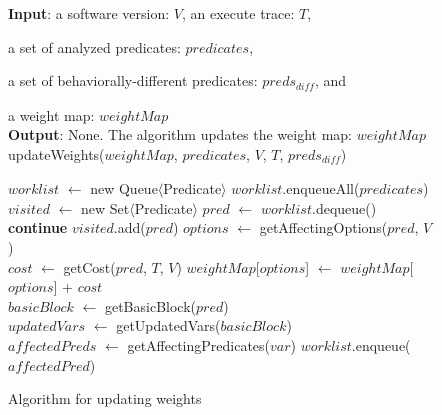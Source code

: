 
\begin{figure}[t]
\textbf{Input}: a software version: $\mathit{V}$, an execute trace: $\mathit{T}$, 

\quad a set of analyzed predicates: $\mathit{predicates}$, 

\quad a set of behaviorally-different predicates: $\mathit{preds_{diff}}$, and

\quad a weight map: $\mathit{weightMap}$\\
\textbf{Output}: None. The algorithm updates the weight map: $\mathit{weightMap}$\\
\vspace{-4mm}%
updateWeights($\mathit{weightMap}$, $\mathit{predicates}$, $\mathit{V}$, $\mathit{T}$, $\mathit{preds_{diff}}$)\\
\begin{algorithmic}[1]
\STATE $\mathit{worklist}$ $\leftarrow$ new Queue$\langle$Predicate$\rangle$
\STATE $\mathit{worklist}$.enqueueAll($\mathit{predicates}$)
\STATE $\mathit{visited}$ $\leftarrow$ new Set$\langle$Predicate$\rangle$
\STATE $\mathit{pred}$ $\leftarrow$ $\mathit{worklist}$.dequeue()
\STATE \textbf{continue}
\ENDIF
\STATE $\mathit{visited}$.add($\mathit{pred}$)
\STATE $\mathit{options}$ $\leftarrow$ getAffectingOptions($\mathit{pred}$, $\mathit{V}$)\\
\STATE $\mathit{cost}$ $\leftarrow$ getCost($\mathit{pred}$, $\mathit{T}$, $\mathit{V}$)
\STATE $\mathit{weightMap}$[$\mathit{options}$] $\leftarrow$ $\mathit{weightMap}$[$\mathit{options}$] + $\mathit{cost}$
\ENDFOR\\
\STATE $\mathit{basicBlock}$ $\leftarrow$ getBasicBlock($\mathit{pred}$)\\
\STATE $\mathit{updatedVars}$ $\leftarrow$ getUpdatedVars($\mathit{basicBlock}$)\\
\STATE $\mathit{affectedPreds}$ $\leftarrow$ getAffectingPredicates($\mathit{var}$)
\STATE $\mathit{worklist}$.enqueue($\mathit{affectedPred}$)
\ENDIF
\ENDFOR
\ENDWHILE
\vspace{-2mm}
\end{algorithmic}
\caption{Algorithm for updating weights
\label{fig:recommend}
}
\end{figure}
